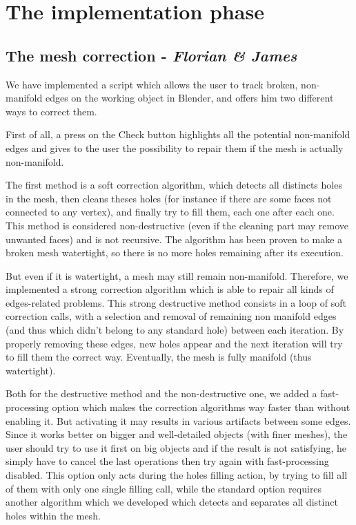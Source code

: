 \documentclass{report}
\begin{document}
\chapter{The implementation phase}

\section{The mesh correction - \textit{Florian \& James}}

We have implemented a script which allows the user to track broken, non-manifold edges on the working object in Blender, and offers him two different ways to correct them.

First of all, a press on the Check button highlights all the potential non-manifold edges and gives to the user the possibility to repair them if the mesh is actually non-manifold.

The first method is a soft correction algorithm, which detects all distincts holes in the mesh, then cleans theses holes (for instance if there are some faces not connected to any vertex), and finally try to fill them, each one after each one. This method is considered non-destructive (even if the cleaning part may remove unwanted faces) and is not recursive. The algorithm has been proven to make a broken mesh watertight, so there is no more holes remaining after its execution.

But even if it is watertight, a mesh may still remain non-manifold. Therefore, we implemented a strong correction algorithm which is able to repair all kinds of edges-related problems. This strong destructive method consists in a loop of soft correction calls, with a selection and removal of remaining non manifold edges (and thus which didn't belong to any standard hole) between each iteration. By properly removing these edges, new holes appear and the next iteration will try to fill them the correct way. Eventually, the mesh is fully manifold (thus watertight).

Both for the destructive method and the non-destructive one, we added a fast-processing option which makes the correction algorithms way faster than without enabling it. But activating it may results in various artifacts between some edges. Since it works better on bigger and well-detailed objects (with finer meshes), the user should try to use it first on big objects and if the result is not satisfying, he simply have to cancel the last operations then try again with fast-processing disabled. This option only acts during the holes filling action, by trying to fill all of them with only one single filling call, while the standard option requires another algorithm which we developed which detects and separates all distinct holes within the mesh.
\end{document}
